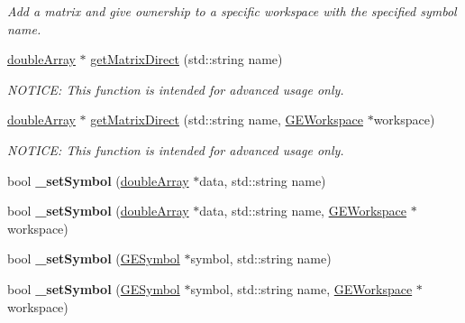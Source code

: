 \begin{DoxyCompactItemize}
\begin{DoxyCompactList}\small\item\em Add a matrix and give ownership to a specific workspace with the specified symbol name. \end{DoxyCompactList}\item 
\hyperlink{classdouble_array}{double\-Array} $\ast$ \hyperlink{class_g_a_u_s_s_a9c8e43c9e342e5d397f1154cdf7bcce8}{get\-Matrix\-Direct} (std\-::string name)
\begin{DoxyCompactList}\small\item\em N\-O\-T\-I\-C\-E\-: This function is intended for advanced usage only. \end{DoxyCompactList}\item 
\hyperlink{classdouble_array}{double\-Array} $\ast$ \hyperlink{class_g_a_u_s_s_a9c413d1d5d7f4f271013ecca99f9e500}{get\-Matrix\-Direct} (std\-::string name, \hyperlink{class_g_e_workspace}{G\-E\-Workspace} $\ast$workspace)
\begin{DoxyCompactList}\small\item\em N\-O\-T\-I\-C\-E\-: This function is intended for advanced usage only. \end{DoxyCompactList}\item 
\hypertarget{class_g_a_u_s_s_a620a949a193326ca5e8e90f3627f59fe}{bool {\bfseries \-\_\-set\-Symbol} (\hyperlink{classdouble_array}{double\-Array} $\ast$data, std\-::string name)}\label{class_g_a_u_s_s_a620a949a193326ca5e8e90f3627f59fe}

\item 
\hypertarget{class_g_a_u_s_s_a6231131c10764c290a6e2cc5a8780fde}{bool {\bfseries \-\_\-set\-Symbol} (\hyperlink{classdouble_array}{double\-Array} $\ast$data, std\-::string name, \hyperlink{class_g_e_workspace}{G\-E\-Workspace} $\ast$workspace)}\label{class_g_a_u_s_s_a6231131c10764c290a6e2cc5a8780fde}

\item 
\hypertarget{class_g_a_u_s_s_a5b17b00ffdc7967218acb816d1534fc1}{bool {\bfseries \-\_\-set\-Symbol} (\hyperlink{class_g_e_symbol}{G\-E\-Symbol} $\ast$symbol, std\-::string name)}\label{class_g_a_u_s_s_a5b17b00ffdc7967218acb816d1534fc1}

\item 
\hypertarget{class_g_a_u_s_s_ab3fc0a0962842b45ace9ea31fbd58241}{bool {\bfseries \-\_\-set\-Symbol} (\hyperlink{class_g_e_symbol}{G\-E\-Symbol} $\ast$symbol, std\-::string name, \hyperlink{class_g_e_workspace}{G\-E\-Workspace} $\ast$workspace)}\label{class_g_a_u_s_s_ab3fc0a0962842b45ace9ea31fbd58241}


\end{DoxyCompactItemize}
